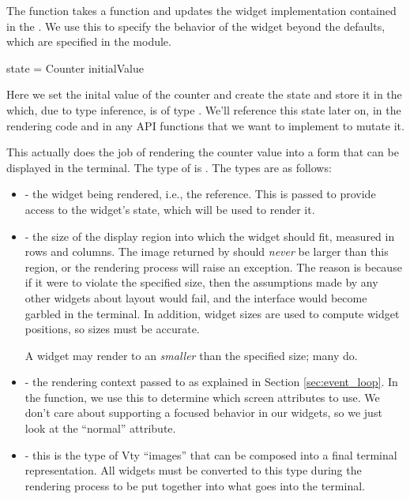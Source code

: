 The  function takes a function  and updates the widget implementation contained in the
.  We use this to specify the behavior of the widget beyond
the defaults, which are specified in the  module.

\begin{haskellcode}
 state = Counter initialValue
\end{haskellcode}

Here we set the inital value of the counter and create the
 state and store it in the  which, due to
type inference, is of type .  We'll reference
this state later on, in the rendering code and in any API functions
that we want to implement to mutate it.


This actually does the job of rendering the counter value into a form
that can be displayed in the terminal.  The type of  is
.  The
types are as follows:

\begin{itemize}
\item {} - the widget being rendered, i.e., the  reference.  This is passed to provide access to the
  widget's state, which will be used to render it.
\item {} - the size of the display region into which
  the widget should fit, measured in rows and columns.  The image
  returned by  should \textit{never} be larger than this
  region, or the rendering process will raise an exception.  The
  reason is because if it were to violate the specified size, then the
  assumptions made by any other widgets about layout would fail, and
  the interface would become garbled in the terminal.  In addition,
  widget sizes are used to compute widget positions, so sizes must be
  accurate.

  A widget may render to an  \textit{smaller} than the
  specified size; many do.
\item {} - the rendering context passed to 
  as explained in Section \ref{sec:event_loop}.  In the 
  function, we use this to determine which screen attributes to use.
  We don't care about supporting a focused behavior in our
   widgets, so we just look at the ``normal'' attribute.
\item {} - this is the type of Vty ``images'' that can be
  composed into a final terminal representation.  All widgets must be
  converted to this type during the rendering process to be put
  together into what goes into the terminal.
\end{itemize}

